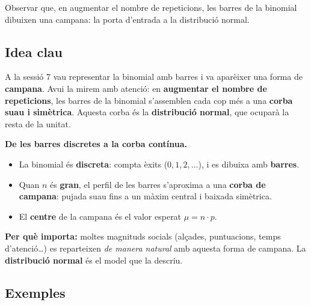 %
{Observar que, en augmentar el nombre de repeticions, les barres de la binomial dibuixen una campana: la porta d'entrada a la distribució normal.}

\subsection{Idea clau}

A la sessió 7 vau representar la binomial amb barres i va aparèixer una forma de
\textbf{campana}. Avui la mirem amb atenció: en \textbf{augmentar el nombre de
repeticions}, les barres de la binomial s'assemblen cada cop més a una \textbf{corba
suau i simètrica}. Aquesta corba és la \textbf{distribució normal}, que ocuparà la resta
de la unitat.

\begin{idea}
\textbf{De les barres discretes a la corba contínua.}
\begin{itemize}[leftmargin=1.4em, itemsep=2pt]
  \item La binomial és \textbf{discreta}: compta èxits ($0,1,2,\dots$), i es dibuixa amb
        \textbf{barres}.
  \item Quan $n$ és \textbf{gran}, el perfil de les barres s'aproxima a una \textbf{corba
        de campana}: pujada suau fins a un màxim central i baixada simètrica.
  \item El \textbf{centre} de la campana és el valor esperat $\mu=n\cdot p$.
\end{itemize}
\textbf{Per què importa:} moltes magnituds socials (alçades, puntuacions, temps
d'atenció\ldots) es reparteixen \emph{de manera natural} amb aquesta forma de campana. La
\textbf{distribució normal} és el model que la descriu.
\end{idea}

\subsection{Exemples}


